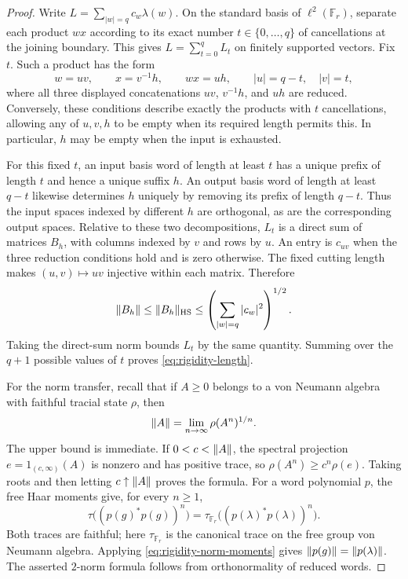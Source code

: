 \begin{proof}
Write $L=\sum_{|w|=q}c_w\lambda(w)$.  On the standard basis of
$\ell^2(\mathbb F_r)$, separate each product $wx$ according to its
exact number $t\in\{0,\ldots,q\}$ of cancellations at the joining
boundary.  This gives $L=\sum_{t=0}^q L_t$ on finitely supported vectors.
Fix $t$.  Such a product has the form
\[
 w=uv,\qquad x=v^{-1}h,\qquad wx=uh,
 \qquad |u|=q-t,\quad |v|=t,
\]
where all three displayed concatenations $uv$, $v^{-1}h$, and $uh$
are reduced.  Conversely, these conditions describe exactly the
products with $t$ cancellations, allowing any of $u,v,h$ to be empty
when its required length permits this.  In particular, $h$ may be empty
when the input is exhausted.

For this fixed $t$, an input basis word of length at least $t$ has a
unique prefix of length $t$ and hence a unique suffix $h$.  An output
basis word of length at least $q-t$ likewise determines $h$ uniquely by
removing its prefix of length $q-t$.  Thus the input spaces indexed by
different $h$ are orthogonal, as are the corresponding output spaces.
Relative to these two decompositions, $L_t$ is a direct sum of matrices
$B_h$, with columns indexed by $v$ and rows by $u$.  An entry is
$c_{uv}$ when the three reduction conditions hold and is zero otherwise.
The fixed cutting length makes $(u,v)\mapsto uv$ injective within each
matrix.  Therefore
\[
 \lVert B_h\rVert\leq\lVert B_h\rVert_{\mathrm{HS}}
 \leq\left(\sum_{|w|=q}|c_w|^2\right)^{1/2}.
\]
Taking the direct-sum norm bounds $L_t$ by the same quantity.  Summing
over the $q+1$ possible values of $t$ proves
\eqref{eq:rigidity-length}.

For the norm transfer, recall that if $A\geq0$ belongs to a von Neumann
algebra with faithful tracial state $\rho$, then
\begin{equation}\label{eq:rigidity-norm-moments}
 \lVert A\rVert=\lim_{n\to\infty}\rho(A^n)^{1/n}.
\end{equation}
The upper bound is immediate.  If $0<c<\lVert A\rVert$, the spectral
projection $e=1_{(c,\infty)}(A)$ is nonzero and has positive trace, so
$\rho(A^n)\geq c^n\rho(e)$.  Taking roots and then letting
$c\uparrow\lVert A\rVert$ proves the formula.  For a word polynomial $p$,
the free Haar moments give, for every $n\geq1$,
\[
 \tau\bigl((p(g)^*p(g))^n\bigr)
 =\tau_{\mathbb F_r}\bigl((p(\lambda)^*p(\lambda))^n\bigr).
\]
Both traces are faithful; here $\tau_{\mathbb F_r}$ is the canonical
trace on the free group von Neumann algebra.  Applying
\eqref{eq:rigidity-norm-moments} gives $\lVert p(g)\rVert=\lVert p(\lambda)\rVert$.
The asserted $2$-norm formula follows from orthonormality of reduced
words.
\end{proof}

